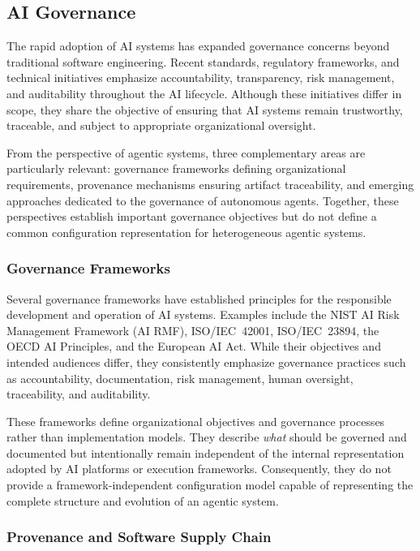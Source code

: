 \documentclass[10pt]{article}
\begin{document}
\subsection{AI Governance}
\label{sec:ai_governance}

The rapid adoption of AI systems has expanded governance concerns beyond traditional software engineering. Recent standards, regulatory frameworks, and technical initiatives emphasize accountability, transparency, risk management, and auditability throughout the AI lifecycle. Although these initiatives differ in scope, they share the objective of ensuring that AI systems remain trustworthy, traceable, and subject to appropriate organizational oversight.

From the perspective of agentic systems, three complementary areas are particularly relevant: governance frameworks defining organizational requirements, provenance mechanisms ensuring artifact traceability, and emerging approaches dedicated to the governance of autonomous agents. Together, these perspectives establish important governance objectives but do not define a common configuration representation for heterogeneous agentic systems.

\subsubsection{Governance Frameworks}
\label{sec:governance_frameworks}

Several governance frameworks have established principles for the responsible development and operation of AI systems. Examples include the NIST AI Risk Management Framework (AI RMF), ISO/IEC~42001, ISO/IEC~23894, the OECD AI Principles, and the European AI Act. While their objectives and intended audiences differ, they consistently emphasize governance practices such as accountability, documentation, risk management, human oversight, traceability, and auditability.

These frameworks define organizational objectives and governance processes rather than implementation models. They describe \emph{what} should be governed and documented but intentionally remain independent of the internal representation adopted by AI platforms or execution frameworks. Consequently, they do not provide a framework-independent configuration model capable of representing the complete structure and evolution of an agentic system.

\subsubsection{Provenance and Software Supply Chain}
\label{sec:provenance_supply_chain}
\end{document}
